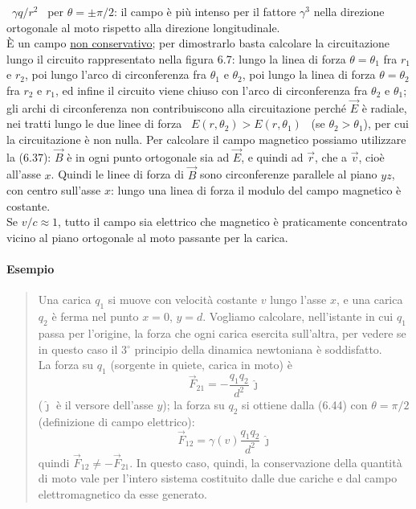\ $\gamma q/r^2$ \ per $\theta=\pm\pi/2$: il campo \`e pi\`u intenso per il
fattore $\gamma^3$ nella direzione ortogonale al moto rispetto alla direzione
longitudinale.\\
\`E un campo \underline{non conservativo}; per dimostrarlo basta calcolare la
circuitazione lungo il circuito rappresentato nella figura 6.7: lungo la linea
di forza $\theta=\theta_1$ fra $r_1$ e $r_2$, poi lungo l'arco di circonferenza
fra $\theta_1$ e $\theta_2$, poi lungo la linea di forza $\theta=\theta_2$ fra
$r_2$ e $r_1$, ed infine il circuito viene chiuso con l'arco di circonferenza
fra $\theta_2$ e $\theta_1$; gli archi di circonferenza non contribuiscono alla
circuitazione perch\'e $\vec E$ \`e radiale, nei tratti lungo le due linee di
forza \ $E(r,\theta_2)>E(r,\theta_1)$ \ (se $\theta_2>\theta_1$), per cui la
circuitazione \`e non nulla.
Per calcolare il campo magnetico possiamo utilizzare la (6.37): $\vec B$ \`e in
ogni punto ortogonale sia ad $\vec E$, e quindi ad $\vec r$, che a $\vec v$,
cio\`e all'asse $x$. Quindi le linee di forza di $\vec B$ sono circonferenze
parallele al piano $yz$, con centro sull'asse $x$: lungo una linea di forza il
modulo del campo magnetico \`e costante.\\
Se $v/c\approx1$, tutto il campo sia elettrico che magnetico \`e praticamente
concentrato vicino al piano ortogonale al moto passante per la carica.

\paragraph{Esempio}
\begin{quote}
  Una carica $q_1$ si muove con velocit\`a costante $v$ lungo l'asse $x$, e una
  carica $q_2$ \`e ferma nel punto $x=0$, $y=d$. Vogliamo calcolare,
  nell'istante in cui $q_1$ passa per l'origine, la forza che ogni carica
  esercita sull'altra, per vedere se in questo caso il 3$^\circ$ principio della
  dinamica newtoniana \`e soddisfatto.\\
  La forza su $q_1$ (sorgente in quiete, carica in moto) \`e
  \begin{equation}
    \vec F_{21}=-\frac{q_1q_2}{d^2}\,\hat\jmath
    \tag{6.45}
  \end{equation}
  ($\hat\jmath$ \`e il versore dell'asse $y$); la forza su $q_2$ si ottiene
  dalla (6.44) con $\theta=\pi/2$ (definizione di campo elettrico):
  \begin{equation}
    \vec F_{12}=\gamma(v)\frac{q_1q_2}{d^2}\,\hat\jmath
    \tag{6.46}
  \end{equation}
  quindi $\vec F_{12}\ne-\vec F_{21}$. In questo caso, quindi, la conservazione
  della quantit\`a di moto vale per l'intero sistema costituito dalle due
  cariche e dal campo elettromagnetico da esse generato.
\end{quote}

